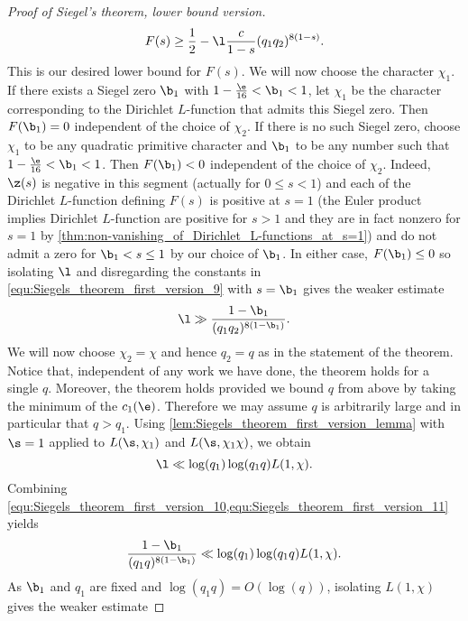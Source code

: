 \begin{proof}[Proof of Siegel's theorem, lower bound version]
        \begin{equation}\label{equ:Siegels_theorem_first_version_9}
          F(s) \ge \frac{1}{2}-\l\frac{c}{1-s}(q_{1}q_{2})^{8(1-s)}.
        \end{equation}
        This is our desired lower bound for $F(s)$. We will now choose the character $\chi_{1}$. If there exists a Siegel zero $\b_{1}$ with $1-\frac{\e}{16} < \b_{1} < 1$, let $\chi_{1}$ be the character corresponding to the Dirichlet $L$-function that admits this Siegel zero. Then $F(\b_{1}) = 0$ independent of the choice of $\chi_{2}$. If there is no such Siegel zero, choose $\chi_{1}$ to be any quadratic primitive character and $\b_{1}$ to be any number such that $1-\frac{\e}{16} < \b_{1} < 1$. Then $F(\b_{1}) < 0$ independent of the choice of $\chi_{2}$. Indeed, $\z(s)$ is negative in this segment (actually for $0 \le s < 1$) and each of the Dirichlet $L$-function defining $F(s)$ is positive at $s = 1$ (the Euler product implies Dirichlet $L$-function are positive for $s > 1$ and they are in fact nonzero for $s = 1$ by \cref{thm:non-vanishing_of_Dirichlet_L-functions_at_s=1}) and do not admit a zero for $\b_{1} < s \le 1$ by our choice of $\b_{1}$. In either case, $F(\b_{1}) \le 0$ so isolating $\l$ and disregarding the constants in \cref{equ:Siegels_theorem_first_version_9} with $s = \b_{1}$ gives the weaker estimate
        \begin{equation}\label{equ:Siegels_theorem_first_version_10}
          \l \gg \frac{1-\b_{1}}{(q_{1}q_{2})^{8(1-\b_{1})}}.
        \end{equation}
        We will now choose $\chi_{2} = \chi$ and hence $q_{2} = q$ as in the statement of the theorem. Notice that, independent of any work we have done, the theorem holds for a single $q$. Moreover, the theorem holds provided we bound $q$ from above by taking the minimum of the $c_{1}(\e)$. Therefore we may assume $q$ is arbitrarily large and in particular that $q > q_{1}$. Using \cref{lem:Siegels_theorem_first_version_lemma} with $\s = 1$ applied to $L(\s,\chi_{1})$ and $L(\s,\chi_{1}\chi)$, we obtain
        \begin{equation}\label{equ:Siegels_theorem_first_version_11}
          \l \ll \log(q_{1})\log(q_{1}q)L(1,\chi).
        \end{equation}
        Combining \cref{equ:Siegels_theorem_first_version_10,equ:Siegels_theorem_first_version_11} yields
        \[
          \frac{1-\b_{1}}{(q_{1}q)^{8(1-\b_{1})}} \ll \log(q_{1})\log(q_{1}q)L(1,\chi).
        \]
        As $\b_{1}$ and $q_{1}$ are fixed and $\log(q_{1}q) = O(\log(q))$, isolating $L(1,\chi)$ gives the weaker estimate

\end{proof}
